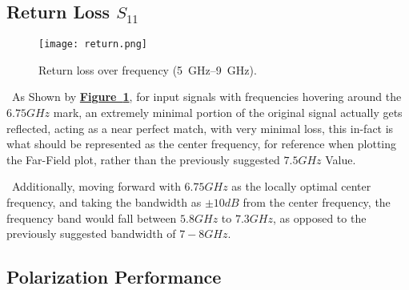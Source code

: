 \documentclass[11pt]{article}
\newcommand{\figref}[1]{\textbf{\hyperref[#1]{Figure~\ref*{#1}}}}
\begin{document}
\subsection{Return Loss \texorpdfstring{$S_{11}$}{S11}}
\begin{figure}[H]
  \centering
  \texttt{[image: return.png]}
  \caption{Return loss over frequency (\SI{5}{GHz}--\SI{9}{GHz}).}
  \label{fig:return}
\end{figure}

\textbullet\ As Shown by \figref{fig:return}, for input signals with frequencies hovering around the $6.75GHz$ mark, an extremely minimal portion of the original signal actually gets reflected, acting as a near perfect match, with very minimal loss, this in-fact is what should be represented as the center frequency, for reference when plotting the Far-Field plot, rather than the previously suggested $7.5GHz$ Value.

\textbullet\ Additionally, moving forward with $6.75GHz$ as the locally optimal center frequency, and taking the bandwidth as $\pm 10dB$ from the center frequency, the frequency band would fall between $5.8GHz$ to $7.3GHz$, as opposed to the previously suggested bandwidth of $7-8GHz$.




\subsection{Polarization Performance}
\newlength{\rowwidth}\setlength{\rowwidth}{0.98\textwidth}
\newlength{\rowheight}\setlength{\rowheight}{0.25\textheight} %
\end{document}
